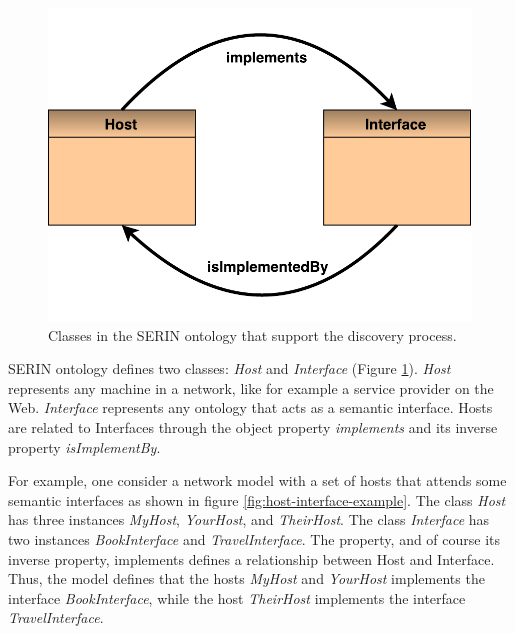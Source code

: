 \documentclass{singlecol-new}
\theoremstyle{TH}{
\newtheorem{lemma}{Lemma}
\newtheorem{theorem}[lemma]{Theorem}
\newtheorem{corrolary}[lemma]{Corrolary}
\newtheorem{conjecture}[lemma]{Conjecture}
\newtheorem{proposition}[lemma]{Proposition}
\newtheorem{claim}[lemma]{Claim}
\newtheorem{stheorem}[lemma]{Wrong Theorem}
\newtheorem{algorithm}{Algorithm}
}
\theoremstyle{THrm}{
\newtheorem{definition}{Definition}[section]
\newtheorem{question}{Question}[section]
\newtheorem{remark}{Remark}
\newtheorem{scheme}{Scheme}
}
\theoremstyle{THhit}{
\newtheorem{case}{Case}[section]
}
\begin{document}
\begin{figure}[!htb]
	\includegraphics[scale=.55]{images/serin-discovery-classes.pdf}
	\centering
	\caption{Classes in the SERIN ontology that support the discovery process.}
	\label{fig:discoveryclass}
\end{figure}

SERIN ontology defines two classes: \textit{Host} and \textit{Interface} (Figure \ref{fig:discoveryclass}). \textit{Host} represents any machine in a network, like for example a service provider on the Web. \textit{Interface} represents any ontology that acts as a semantic interface.
Hosts are related to Interfaces through the object property \textit{implements} and its inverse property \textit{isImplementBy}. 

For example, one consider a network model with a set of hosts that attends some semantic interfaces as shown in figure \ref{fig:host-interface-example}. The class \textit{Host} has three instances \textit{MyHost}, \textit{YourHost}, and \textit{TheirHost}. The class \textit{Interface} has two instances \textit{BookInterface} and \textit{TravelInterface}. 
The property, and of course its inverse property, implements defines a relationship between Host and Interface. 
Thus, the model defines that the hosts \textit{MyHost} and \textit{YourHost} implements the interface \textit{BookInterface}, while the host \textit{TheirHost} implements the interface \textit{TravelInterface}.
\end{document}
